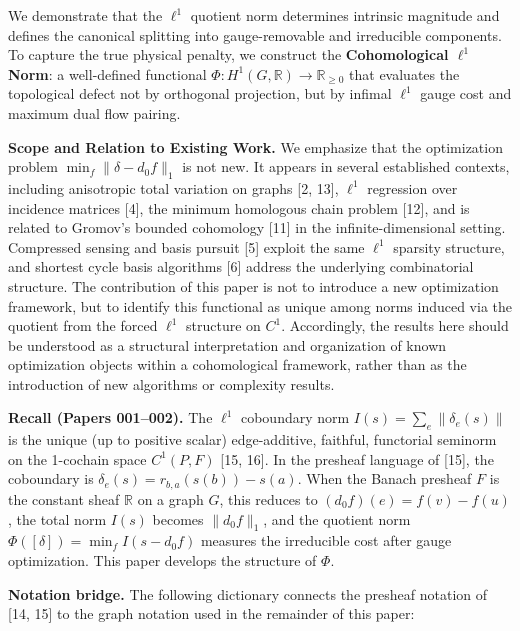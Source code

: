 \documentclass[
]{article}
\begin{document}
We demonstrate that the \(\ell^1\) quotient norm determines intrinsic
magnitude and defines the canonical splitting into gauge-removable and
irreducible components. To capture the true physical penalty, we
construct the \textbf{Cohomological \(\ell^1\) Norm}: a well-defined
functional \(\Phi : H^1(G, \mathbb{R}) \to \mathbb{R}_{\geq 0}\) that
evaluates the topological defect not by orthogonal projection, but by
infimal \(\ell^1\) gauge cost and maximum dual flow pairing.

\textbf{Scope and Relation to Existing Work.} We emphasize that the
optimization problem \(\min_f \|\delta - d_0 f\|_1\) is not new. It
appears in several established contexts, including anisotropic total
variation on graphs {[}2, 13{]}, \(\ell^1\) regression over incidence
matrices {[}4{]}, the minimum homologous chain problem {[}12{]}, and is
related to Gromov's bounded cohomology {[}11{]} in the
infinite-dimensional setting. Compressed sensing and basis pursuit
{[}5{]} exploit the same \(\ell^1\) sparsity structure, and shortest
cycle basis algorithms {[}6{]} address the underlying combinatorial
structure. The contribution of this paper is not to introduce a new
optimization framework, but to identify this functional as unique among
norms induced via the quotient from the forced \(\ell^1\) structure on
\(C^1\). Accordingly, the results here should be understood as a
structural interpretation and organization of known optimization objects
within a cohomological framework, rather than as the introduction of new
algorithms or complexity results.

\textbf{Recall (Papers 001--002).} The \(\ell^1\) coboundary norm
\(I(s) = \sum_e \|\delta_e(s)\|\) is the unique (up to positive scalar)
edge-additive, faithful, functorial seminorm on the 1-cochain space
\(C^1(P, F)\) {[}15, 16{]}. In the presheaf language of {[}15{]}, the
coboundary is \(\delta_e(s) = r_{b,a}(s(b)) - s(a)\). When the Banach
presheaf \(F\) is the constant sheaf \(\mathbb{R}\) on a graph \(G\),
this reduces to \((d_0 f)(e) = f(v) - f(u)\), the total norm \(I(s)\)
becomes \(\|d_0 f\|_1\), and the quotient norm
\(\Phi([\delta]) = \min_f I(s - d_0 f)\) measures the irreducible cost
after gauge optimization. This paper develops the structure of \(\Phi\).

\textbf{Notation bridge.} The following dictionary connects the presheaf
notation of {[}14, 15{]} to the graph notation used in the remainder of
this paper:
\end{document}
